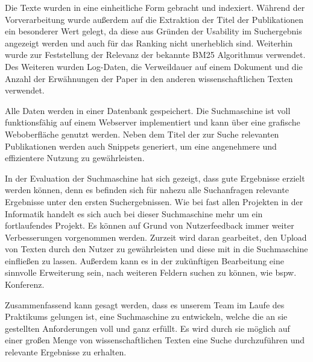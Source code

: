 Die Texte wurden in eine einheitliche Form gebracht und
indexiert. Während der Vorverarbeitung wurde außerdem auf die
Extraktion der Titel der Publikationen ein besonderer Wert gelegt, da
diese aus Gründen der Usability im Suchergebnis angezeigt werden und 
auch für das Ranking nicht unerheblich sind. Weiterhin wurde zur
Feststellung der Relevanz der bekannte BM25 Algorithmus
verwendet. Des Weiteren wurden Log-Daten, die Verweildauer auf einem
Dokument und die Anzahl der Erwähnungen der Paper in den anderen
wissenschaftlichen Texten verwendet.

Alle Daten werden in einer Datenbank gespeichert. Die Suchmaschine ist
voll funktionsfähig auf einem Webserver implementiert und kann über
eine grafische Weboberfläche genutzt werden. Neben dem Titel der zur
Suche relevanten Publikationen werden auch Snippets generiert, um eine
angenehmere und effizientere Nutzung zu gewährleisten.

In der Evaluation der Suchmaschine hat sich gezeigt, dass gute
Ergebnisse erzielt werden können, denn es befinden sich für nahezu
alle Suchanfragen relevante Ergebnisse unter den ersten
Suchergebnissen.  Wie bei fast allen Projekten in der Informatik
handelt es sich auch bei dieser Suchmaschine mehr um ein fortlaufendes
Projekt. Es können auf Grund von Nutzerfeedback immer weiter
Verbesserungen vorgenommen werden. Zurzeit wird daran gearbeitet, den
Upload von Texten durch den Nutzer zu gewährleisten und diese mit in
die Suchmaschine einfließen zu lassen. 
Außerdem kann es in der zukünftigen Bearbeitung eine sinnvolle
Erweiterung sein, nach weiteren Feldern suchen zu können, wie bspw.
Konferenz.

Zusammenfassend kann gesagt werden, dass es unserem Team im Laufe des
Praktikums gelungen ist, eine Suchmaschine zu entwickeln, welche die
an sie gestellten Anforderungen voll und ganz erfüllt. Es wird durch
sie möglich auf einer großen Menge von wissenschaftlichen Texten eine
Suche durchzuführen und relevante Ergebnisse zu erhalten.

